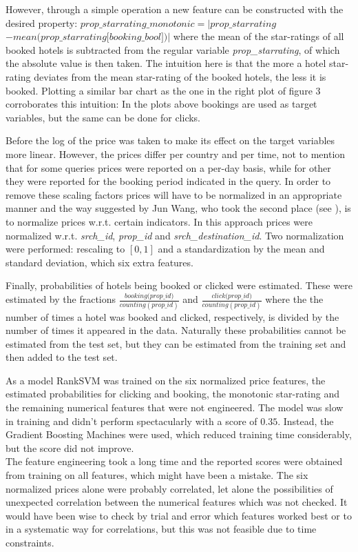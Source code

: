 \documentclass{llncs}
\begin{document}
\noindent However, through a simple operation a new feature can be constructed with the desired property: $\textit{prop\_starrating\_monotonic} = |\textit{prop\_starrating}$ \\ 
$ - \textit{mean(prop\_starrating[booking\_bool])}|$ where the mean of the star-ratings of all booked hotels is subtracted from the regular variable \textit{prop\_starrating}, of which the absolute value is then taken. The intuition here is that the more a hotel star-rating deviates from the mean star-rating of the booked hotels, the less it is booked. Plotting a similar bar chart as the one in the right plot of figure 3 corroborates this intuition:
In the plots above bookings are used as target variables, but the same can be done for clicks.

Before the log of the price was taken to make its effect on the target variables more linear. However, the prices differ per country and per time, not to mention that for some queries prices were reported on a per-day basis, while for other they were reported for the booking period indicated in the query. In order to remove these scaling factors prices will have to be normalized in an appropriate manner and the way suggested by Jun Wang, who took the second place (see \cite{WinNT2}), is to normalize prices w.r.t. certain indicators.  In this approach prices were normalized w.r.t. \textit{srch\_id}, \textit{prop\_id} and \textit{srch\_destination\_id}. Two normalization were performed: rescaling to $[0,1]$ and a standardization by the mean and standard deviation, which six extra features.

Finally, probabilities of hotels being booked or clicked were estimated. These were estimated by the fractions $\displaystyle \frac{\textit{booking(prop\_id)}}{counting(prop\_id)}$ and $\displaystyle \frac{\textit{click(prop\_id)}}{counting(prop\_id)}$ where the the number of times a hotel was booked and clicked, respectively, is divided by the number of times it appeared in the data. Naturally these probabilities cannot be estimated from the test set, but they can be estimated from the training set and then added to the test set.

As a model RankSVM was trained on the six normalized price features, the estimated probabilities for clicking and booking, the monotonic star-rating and the remaining numerical features that were not engineered. The model was slow in training and didn't perform spectacularly with a score of $0.35$. Instead, the Gradient Boosting Machines were used, which reduced training time considerably, but the score did not improve.\\
\indent The feature engineering took a long time and the reported scores were obtained from training on all features, which might have been a mistake. The six normalized prices alone were probably correlated, let alone the possibilities of unexpected correlation between the numerical features which was not checked. It would have been wise to check by trial and error which features worked best or to in a systematic way for correlations, but this was not feasible due to time constraints. 
\end{document}
